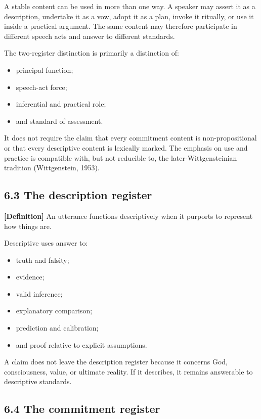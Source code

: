 \documentclass[
  11pt,
]{article}
\providecommand{\tightlist}{%
  \setlength{\itemsep}{0pt}\setlength{\parskip}{0pt}}
\begin{document}
A stable content can be used in more than one way. A speaker may assert
it as a description, undertake it as a vow, adopt it as a plan, invoke
it ritually, or use it inside a practical argument. The same content may
therefore participate in different speech acts and answer to different
standards.

The two-register distinction is primarily a distinction of:

\begin{itemize}
\tightlist
\item
  principal function;
\item
  speech-act force;
\item
  inferential and practical role;
\item
  and standard of assessment.
\end{itemize}

It does not require the claim that every commitment content is
non-propositional or that every descriptive content is lexically marked.
The emphasis on use and practice is compatible with, but not reducible
to, the later-Wittgensteinian tradition (Wittgenstein, 1953).

\subsection{6.3 The description
register}\label{the-description-register}

\textbf{{[}Definition{]}} An utterance functions descriptively when it
purports to represent how things are.

Descriptive uses answer to:

\begin{itemize}
\tightlist
\item
  truth and falsity;
\item
  evidence;
\item
  valid inference;
\item
  explanatory comparison;
\item
  prediction and calibration;
\item
  and proof relative to explicit assumptions.
\end{itemize}

A claim does not leave the description register because it concerns God,
consciousness, value, or ultimate reality. If it describes, it remains
answerable to descriptive standards.

\subsection{6.4 The commitment register}\label{the-commitment-register}
\end{document}
